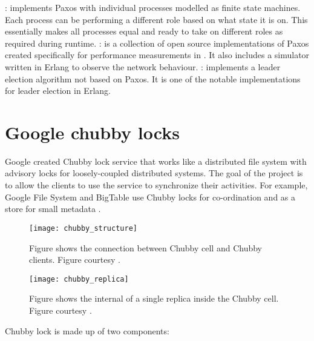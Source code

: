 \begin{itemize}
    : \citep{Uenishi2012} implements Paxos with
    individual processes modelled as finite state machines. Each process can
    be performing a different role based on what state it is on. This 
    essentially makes all processes equal and ready to take on different roles
    as required during runtime.
    : \citet{Lugano2012} is a collection of open source 
    implementations of Paxos created specifically for performance measurements
    in \citet{MarandiPSP10}. It also includes a simulator written in Erlang to
    observe the network behaviour.
    : \citet{Ulf2012} implements a leader election algorithm
    not based on Paxos. It is one of the notable implementations for leader
    election in Erlang.
\end{itemize}

\section{Google chubby locks}
\label{section:chubby.locks}

Google created Chubby lock service \citep{Burrows06} that works like a 
distributed file system with advisory locks for loosely-coupled distributed 
systems. The goal of the project is to allow the clients to use the service
to synchronize their activities. For example, Google File System \citep{gfs} 
and BigTable \citep{ChangDGHWBCFG06} use Chubby locks for co-ordination and
as a store for small metadata \citep{ChandraGR07}.

\begin{figure}
  \texttt{[image: chubby\_structure]}
  \caption[Chubby structure]{%
    Figure shows the connection between Chubby cell and Chubby clients. 
    Figure courtesy \citet{Burrows06}.}
  \label{figure:chubby.structure}
\end{figure}

\begin{figure}
  \texttt{[image: chubby\_replica]}
  \caption[Chubby Replica]{%
    Figure shows the internal of a single replica inside the Chubby cell.
    Figure courtesy \citet{ChandraGR07}.}
  \label{figure:chubby.structure}
\end{figure}


Chubby lock is made up of two components:

